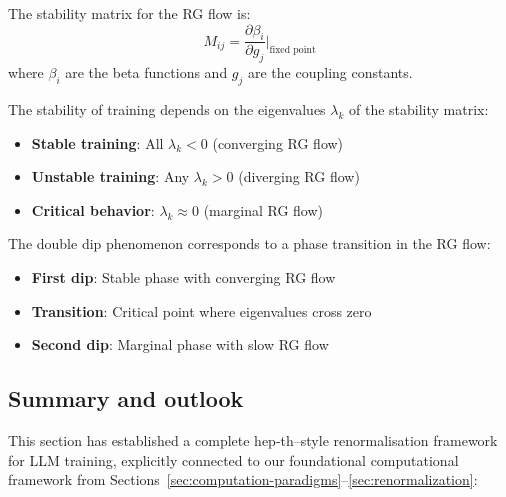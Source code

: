 \begin{definition}
\label{def:stability_matrix_training}
The stability matrix for the RG flow is:
\begin{equation}
  M_{ij} = \frac{\partial \beta_i}{\partial g_j} \bigg|_{\text{fixed point}}
  \label{eq:stability_matrix}
\end{equation}
where $\beta_i$ are the beta functions and $g_j$ are the coupling constants.
\end{definition}

\begin{theorem}
\label{thm:stability_classification_training}
The stability of training depends on the eigenvalues $\lambda_k$ of the stability matrix:
\begin{itemize}
\item \textbf{Stable training}: All $\lambda_k < 0$ (converging RG flow)
\item \textbf{Unstable training}: Any $\lambda_k > 0$ (diverging RG flow)
\item \textbf{Critical behavior}: $\lambda_k \approx 0$ (marginal RG flow)
\end{itemize}
\end{theorem}

\begin{proposition}
\label{prop:double_dip_phase_transition}
The double dip phenomenon corresponds to a phase transition in the RG flow:
\begin{itemize}
\item \textbf{First dip}: Stable phase with converging RG flow
\item \textbf{Transition}: Critical point where eigenvalues cross zero
\item \textbf{Second dip}: Marginal phase with slow RG flow
\end{itemize}
\end{proposition}

\subsection{Summary and outlook}

This section has established a complete hep-th–style renormalisation framework for LLM training, explicitly connected to our foundational computational framework from Sections~\ref{sec:computation-paradigms}--\ref{sec:renormalization}:

